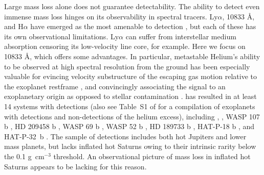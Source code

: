 \documentclass[twocolumn]{aastex631}
\begin{document}
Large mass loss alone does not guarantee detectability.  The ability to detect even immense mass loss hinges on its observability in spectral tracers.  Ly$\alpha$,  10833 \AA, and H$\alpha$ have emerged as the most amenable to detection \citep{2000ApJ...537..916S,2003Natur.422..143V,2012ApJ...751...86J,2018NatAs...2..714Y,2018ApJ...855L..11O,2018Natur.557...68S, 2022arXiv221116243D,2023MNRAS.518.4357O}, but each of these has its own observational limitations.  Ly$\alpha$ can suffer from interstellar medium  absorption censoring its low-velocity line core, for example.  Here we focus on  10833 \AA, which offers some advantages.  In particular, metastable Helium's ability to be observed at high spectral resolution from the ground has been especially valuable for evincing velocity substructure of the escaping gas motion relative to the exoplanet restframe \citep{2019A&A...629A.110A,2020ApJ...894...97N}, and convincingly associating the signal to an exoplanetary origin as opposed to stellar contamination \citep{2018AJ....156..189C}.   has resulted in at least 14 systems with detections (also see Table~S1 of \citealt{doi:10.1126/sciadv.adf8736} for a compilation of exoplanets with detections and non-detections of the helium excess), including  \citep{2020ApJ...894...97N, 2021A&A...647A.129L},  \citep{2022AJ....163...68Z}, WASP 107 b \citep{2019A&A...623A..58A,2020AJ....159..115K}, HD 209458 b \citep{2019A&A...629A.110A}, WASP 69 b \citep{2020AJ....159..278V}, WASP 52 b \citep{2020AJ....159..278V}, HD 189733 b \citep{2021A&A...647A.129L}, HAT-P-18 b \citep{2021ApJ...909L..10P}, and HAT-P-32~b \citep{2022A&A...657A...6C, doi:10.1126/sciadv.adf8736}.  The sample of detections includes both hot Jupiters and lower mass planets, but lacks inflated hot Saturns owing to their intrinsic rarity below the 0.1 g~cm$^{-3}$ threshold. An observational picture of mass loss in inflated hot Saturns appears to be lacking for this reason.
\end{document}
